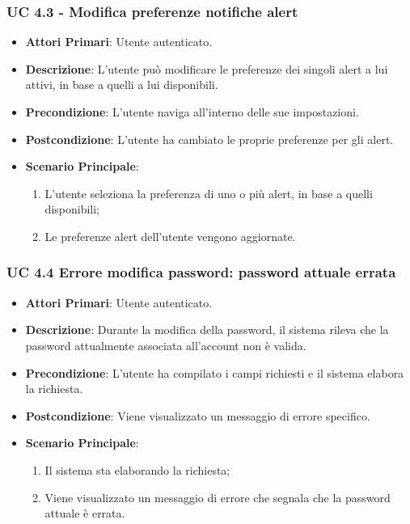			\subsubsection{UC 4.3 - Modifica preferenze notifiche alert}
			\begin{itemize}
				\item \textbf{Attori Primari}: Utente autenticato.
				\item \textbf{Descrizione}: L'utente può modificare le preferenze dei singoli alert a lui attivi, in base a quelli a lui disponibili.
				\item \textbf{Precondizione}: L'utente naviga all'interno delle sue impostazioni.
				\item \textbf{Postcondizione}: L'utente ha cambiato le proprie preferenze per gli alert.
				\item \textbf{Scenario Principale}:
				\begin{enumerate}
					\item{L'utente seleziona la preferenza di uno o più alert, in base a quelli disponibili;}
					\item{Le preferenze alert dell'utente vengono aggiornate.}
				\end{enumerate}
			\end{itemize}	

			\subsubsection{UC 4.4 Errore modifica password: password attuale errata}
			\begin{itemize}
				\item \textbf{Attori Primari}: Utente autenticato.
				\item \textbf{Descrizione}: Durante la modifica della password, il sistema rileva che la password attualmente associata all'account non è valida.
				\item \textbf{Precondizione}: L'utente ha compilato i campi richiesti e il sistema elabora la richiesta.
				\item \textbf{Postcondizione}: Viene visualizzato un messaggio di errore specifico.
				\item \textbf{Scenario Principale}:
				\begin{enumerate}
					\item Il sistema sta elaborando la richiesta;
					\item Viene visualizzato un messaggio di errore che segnala che la password attuale è errata.
				\end{enumerate}
			\end{itemize}

